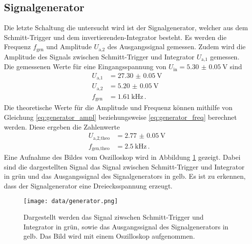\subsection{Signalgenerator}
Die letzte Schaltung die untersucht wird ist der Signalgenerator, welcher aus dem Schmitt-Trigger und dem invertierenden-Integrator besteht.
Es werden die Frequenz $f_\text{gen}$ und Amplitude $U_\text{a,2}$ des Ausgangssignal gemessen.
Zudem wird die Amplitude des Signals zwischen Schmitt-Trigger und Integrator $U_\text{a,1}$ gemessen.
Die gemessenen Werte für eine Eingangsspannung von $U_\text{in} = \SI{5.30(5)}{\V}$ sind 
\begin{align*}
    U_\text{a,1} &= \SI{27.30(5)}{\V} \\
    U_\text{a,2} &= \SI{5.20(5)}{\V} \\
    f_\text{gen} &= \SI{1.61}{\kilo\Hz} \, .
\end{align*}
Die theoretische Werte für die Amplitude und Frequenz können mithilfe von Gleichung \eqref{eq:generator_ampl} beziehungsweise \eqref{eq:generator_freq} berechnet werden.
Diese ergeben die Zahlenwerte 
\begin{align*}
    U_\text{a,2,theo} &= \SI{2.77(5)}{\V} \\
    f_\text{gen,theo} &= \SI{2.5}{\kilo\Hz} \, .
\end{align*}
Eine Aufnahme des Bildes vom Oszilloskop wird in Abbildung \ref{fig:gen_oszi} gezeigt.
Dabei sind die dargestellten Signal das Signal zwischen Schmitt-Trigger und Integrator in grün und das Ausgangssignal des Signalgenerators in gelb.
Es ist zu erkennen, dass der Signalgenerator eine Dreiecksspannung erzeugt.
\begin{figure}
    \centering
    \texttt{[image: data/generator.png]}
    \caption{Dargestellt werden das Signal ziwschen Schmitt-Trigger und Integrator in grün, sowie das Ausgangssignal des Signalgenerators in gelb.
    Das Bild wird mit einem Oszilloskop aufgenommen.}
    \label{fig:gen_oszi}
\end{figure}



